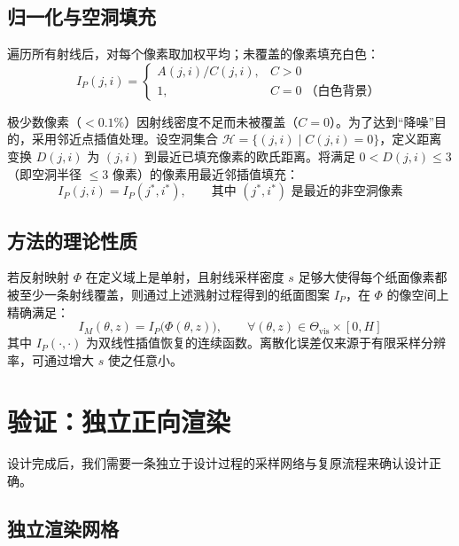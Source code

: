 \documentclass[12pt,a4paper]{ctexart}
\begin{document}
\subsection{归一化与空洞填充}

遍历所有射线后，对每个像素取加权平均；未覆盖的像素填充白色：
\begin{equation}\label{eq:normalize}
    I_P(j,i) = \begin{cases}
        A(j,i)/C(j,i), & C>0 \\[2pt]
        1, & C=0\;\text{（白色背景）}
    \end{cases}
\end{equation}

极少数像素（$<0.1\%$）因射线密度不足而未被覆盖（$C=0$）。为了达到“降噪”目的，采用邻近点插值处理。设空洞集合 $\mathcal{H}=\{(j,i)\mid C(j,i)=0\}$，定义距离变换 $D(j,i)$ 为 $(j,i)$ 到最近已填充像素的欧氏距离。将满足 $0<D(j,i)\le3$（即空洞半径 $\le3$ 像素）的像素用最近邻插值填充：
\begin{equation}
    I_P(j,i) = I_P(j^*, i^*),\qquad \text{其中 $(j^*,i^*)$ 是最近的非空洞像素}
\end{equation}

\subsection{方法的理论性质}

\begin{proposition}[信息无损性]\label{prop:lossless}
若反射映射 $\Phi$ 在定义域上是单射，且射线采样密度 $s$ 足够大使得每个纸面像素都被至少一条射线覆盖，则通过上述溅射过程得到的纸面图案 $I_P$，在 $\Phi$ 的像空间上精确满足：
\begin{equation}
    I_M(\theta,z) = I_P\bigl(\Phi(\theta,z)\bigr),\qquad \forall (\theta,z)\in\Theta_{\mathrm{vis}}\times[0,H]
\end{equation}
其中 $I_P(\cdot,\cdot)$ 为双线性插值恢复的连续函数。离散化误差仅来源于有限采样分辨率，可通过增大 $s$ 使之任意小。
\end{proposition}

\section{验证：独立正向渲染}

设计完成后，我们需要一条独立于设计过程的采样网络与复原流程来确认设计正确。

\subsection{独立渲染网格}
\end{document}
